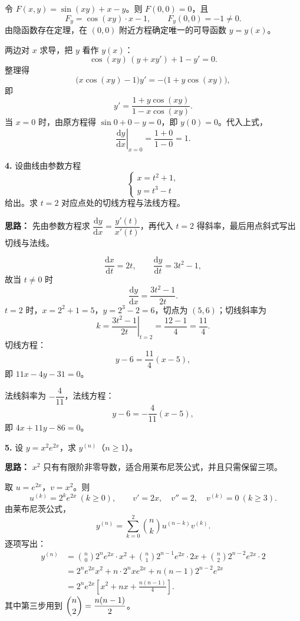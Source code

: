 令 $F(x,y)=\sin(xy)+x-y$。则 $F(0,0)=0$，且
\[
F_y=\cos(xy)\cdot x-1,\qquad F_y(0,0)=-1\ne0.
\]
由隐函数存在定理，在 $(0,0)$ 附近方程确定唯一的可导函数 $y=y(x)$。

两边对 $x$ 求导，把 $y$ 看作 $y(x)$：
\[
\cos(xy)\,(y+xy')+1-y'=0.
\]
整理得
\[
\bigl(x\cos(xy)-1\bigr)y'=-\bigl(1+y\cos(xy)\bigr),
\]
即
\[
y'=\frac{1+y\cos(xy)}{1-x\cos(xy)}.
\]
当 $x=0$ 时，由原方程得 $\sin 0+0-y=0$，即 $y(0)=0$。代入上式，
\[
\left.\frac{\mathrm{d}y}{\mathrm{d}x}\right|_{x=0}=\frac{1+0}{1-0}=1.
\]

\else \answerarea[8] \fi%

\textbf{4.} 设曲线由参数方程
\[
\begin{cases}
x=t^2+1,\\
y=t^3-t
\end{cases}
\]
给出。求 $t=2$ 对应点处的切线方程与法线方程。

\ifshowsolutions%

\textbf{思路：} 先由参数方程求 $\dfrac{\mathrm{d}y}{\mathrm{d}x}=\dfrac{y'(t)}{x'(t)}$，再代入 $t=2$ 得斜率，最后用点斜式写出切线与法线。

\[
\frac{\mathrm{d}x}{\mathrm{d}t}=2t,\qquad \frac{\mathrm{d}y}{\mathrm{d}t}=3t^2-1,
\]
故当 $t\ne0$ 时
\[
\frac{\mathrm{d}y}{\mathrm{d}x}=\frac{3t^2-1}{2t}.
\]
$t=2$ 时，$x=2^2+1=5$，$y=2^3-2=6$，切点为 $(5,6)$；切线斜率为
\[
k=\left.\frac{3t^2-1}{2t}\right|_{t=2}=\frac{12-1}{4}=\frac{11}{4}.
\]
切线方程：
\[
y-6=\frac{11}{4}(x-5),
\]
即 $11x-4y-31=0$。

法线斜率为 $-\dfrac{4}{11}$，法线方程：
\[
y-6=-\frac{4}{11}(x-5),
\]
即 $4x+11y-86=0$。

\else \answerarea[8] \fi%

\textbf{5.} 设 $y=x^2e^{2x}$，求 $y^{(n)}$（$n\ge1$）。

\ifshowsolutions%

\textbf{思路：} $x^2$ 只有有限阶非零导数，适合用莱布尼茨公式，并且只需保留三项。

取 $u=e^{2x}$，$v=x^2$。则
\[
u^{(k)}=2^ke^{2x}\ (k\ge0),\qquad v'=2x,\quad v''=2,\quad v^{(k)}=0\ (k\ge3).
\]
由莱布尼茨公式，
\[
y^{(n)}=\sum_{k=0}^{2}\binom{n}{k}u^{(n-k)}v^{(k)}.
\]
逐项写出：
\[
\begin{aligned}
y^{(n)}
&=\binom{n}{0}2^ne^{2x}\cdot x^2
+\binom{n}{1}2^{n-1}e^{2x}\cdot 2x
+\binom{n}{2}2^{n-2}e^{2x}\cdot 2\\
&=2^ne^{2x}x^2+n\cdot2^nxe^{2x}+n(n-1)2^{n-2}e^{2x}\\
&=2^ne^{2x}\left[x^2+nx+\frac{n(n-1)}{4}\right].
\end{aligned}
\]
其中第三步用到 $\dbinom{n}{2}=\dfrac{n(n-1)}{2}$。

